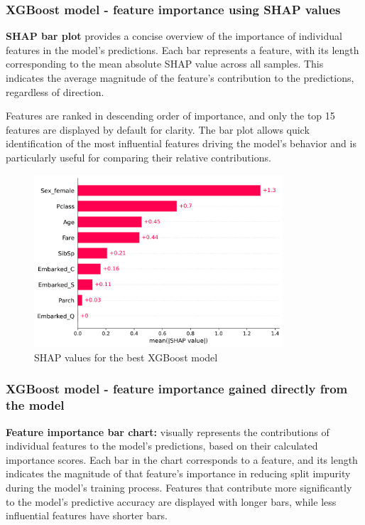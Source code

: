\documentclass{article}%
\begin{document}
\subsubsection{XGBoost model {-} feature importance using SHAP values}%
\label{ssubsec:XGBoostmodel{-}featureimportanceusingSHAPvalues}%

        \textbf{SHAP bar plot} provides a concise overview of the importance of individual features in the model's predictions. 
        Each bar represents a feature, with its length corresponding to the mean absolute SHAP value across all samples. 
        This indicates the average magnitude of the feature's contribution to the predictions, regardless of direction.

        \hspace{20px}Features are ranked in descending order of importance, and only the top 15 features are displayed by default for clarity.
        The bar plot allows quick identification of the most influential features driving the model's behavior and is particularly useful for comparing their relative contributions.\\
        \newline                     


\begin{figure}[h!]%
\centering%
\includegraphics[width=350px]{XAI/XGBoost/global_feature_importance_shap.png}%
\caption{SHAP values for the best XGBoost model}%
\end{figure}

%
\newpage%
\subsubsection{XGBoost model {-} feature importance gained directly from the model}%
\label{ssubsec:XGBoostmodel{-}featureimportancegaineddirectlyfromthemodel}%

        \textbf{Feature importance bar chart:} visually represents the contributions of individual features to the model's predictions, 
        based on their calculated importance scores. Each bar in the chart corresponds to a feature, and its length indicates the magnitude of 
        that feature's importance in reducing split impurity during the model's training process. Features that contribute more significantly to 
        the model's predictive accuracy are displayed with longer bars, while less influential features have shorter bars.
\end{document}
